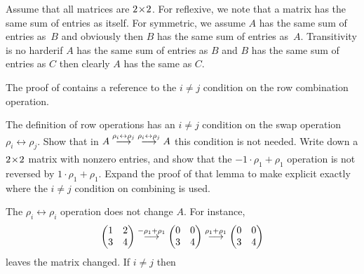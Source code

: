 \begin{exercises}
\begin{answer}
      Assume that all matrices are $2 \! \times \! 2$.
      For reflexive, we note that a matrix has the same sum of entries as
      itself.
      For symmetric, we assume $A$ has the same sum of entries as~$B$ 
      and obviously then $B$ has the same sum of entries as~$A$.
      Transitivity is no harder\Dash if $A$ has the same sum of entries
      as $B$ and $B$ has the same sum of entries as $C$ then clearly
      $A$ has the same as $C$.
    \end{answer}
 \item \label{exer:INotJMakesRowOpsRev}
   The proof of  contains a reference to the 
   $i\neq j$ condition on the row combination operation.
   \begin{exparts}
     \partsitem The definition of row operations has an $i\neq j$ condition on
        the swap operation $\rho_i\leftrightarrow\rho_j$. 
        Show that in 
        $A\mathrel{ \mathop{\longrightarrow}\limits^{\rho_i\leftrightarrow\rho_j\mathstrut}_{ \begin{subarray}{l} \relax \end{subarray}}}\;
          \mathrel{ \mathop{\longrightarrow}\limits^{\rho_i\leftrightarrow\rho_j\mathstrut}_{ \begin{subarray}{l} \relax \end{subarray}}}A$
        this condition is not needed.
     \partsitem Write down a $2 \! \times \! 2$ matrix with nonzero entries,
        and show that the $-1\cdot\rho_1+\rho_1$ operation is not
        reversed by $1\cdot\rho_1+\rho_1$.
     \partsitem Expand the proof of that lemma to make explicit exactly where 
        the $i\neq j$ condition on combining is used.
   \end{exparts}
   \begin{answer}
    \begin{exparts}
      \partsitem The $\rho_i\leftrightarrow\rho_i$ operation does not
        change $A$.
      \partsitem For instance,
        \begin{equation*}
          \begin{pmatrix}
            1  &2  \\
            3  &4  
          \end{pmatrix}
          \mathrel{ \mathop{\longrightarrow}\limits^{-\rho_1+\rho_1\mathstrut}_{ \begin{subarray}{l} \relax \end{subarray}}}
          \begin{pmatrix}
            0  &0  \\
            3  &4  
          \end{pmatrix}
          \mathrel{ \mathop{\longrightarrow}\limits^{\rho_1+\rho_1\mathstrut}_{ \begin{subarray}{l} \relax \end{subarray}}}
          \begin{pmatrix}
            0  &0  \\
            3  &4  
          \end{pmatrix}
        \end{equation*}
        leaves the matrix changed.
      \partsitem If $i\neq j$ then
        \begin{eqnarray*}

\end{eqnarray*}
\end{exparts}
\end{answer}
\end{exercises}
